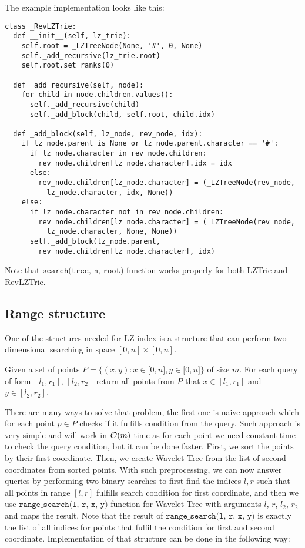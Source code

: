 The example implementation looks like this:

\begin{verbatim}
class _RevLZTrie:
  def __init__(self, lz_trie):
    self.root = _LZTreeNode(None, '#', 0, None)
    self._add_recursive(lz_trie.root)
    self.root.set_ranks(0)

  def _add_recursive(self, node):
    for child in node.children.values():
      self._add_recursive(child)
      self._add_block(child, self.root, child.idx)

  def _add_block(self, lz_node, rev_node, idx):
    if lz_node.parent is None or lz_node.parent.character == '#':
      if lz_node.character in rev_node.children:
        rev_node.children[lz_node.character].idx = idx
      else:
        rev_node.children[lz_node.character] = (_LZTreeNode(rev_node,
          lz_node.character, idx, None))
    else:
      if lz_node.character not in rev_node.children:
        rev_node.children[lz_node.character] = (_LZTreeNode(rev_node,
          lz_node.character, None, None))
      self._add_block(lz_node.parent,
        rev_node.children[lz_node.character], idx)
\end{verbatim}

Note that $\texttt{search(tree, n, root)}$ function works properly for both LZTrie and RevLZTrie.

\subsection{Range structure}
One of the structures needed for LZ-index is a structure that can perform two-dimensional searching in space $[0, n] \times [0,n]$.

\begin{problem}
Given a set of points $P = \{ (x, y): x \in \lbrack0, n\rbrack, y \in \lbrack0, n\rbrack \}$ of size $m$. For each query of form $[l_1, r_1]$, $[l_2, r_2]$ return all points from $P$ that $x \in [l_1, r_1]$ and $y \in [l_2, r_2]$.
\end{problem}

There are many ways to solve that problem, the first one is naive approach which for each point $p \in P$ checks if it fulfills condition from the query. Such approach is very simple and will work in $\mathcal{O}(m)$ time as for each point we need constant time to check the query condition, but it can be done faster. First, we sort the points by their first coordinate. Then, we create Wavelet Tree from the list of second coordinates from sorted points. With such preprocessing, we can now answer queries by performing two binary searches to first find the indices $l, r$ such that all points in range $[l, r]$ fulfills search condition for first coordinate, and then we use $\texttt{range\_search(l, r, x, y)}$ function for Wavelet Tree with arguments $l$, $r$, $l_2$, $r_2$ and maps the result. Note that the result of $\texttt{range\_search(l, r, x, y)}$ is exactly the list of all indices for points that fulfil the condition for first and second coordinate. Implementation of that structure can be done in the following way:

